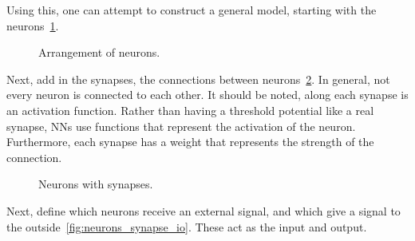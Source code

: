 Using this, one can attempt to construct a general model, starting with the neurons~\ref{fig:neurons}.
\begin{figure}[th]
	\centering
	\caption{Arrangement of neurons.}
	\label{fig:neurons}
\end{figure}
Next, add in the synapses, the connections between neurons~\ref{fig:neurons_synapse}. In general, not every neuron is connected to each other. It should be noted, along each synapse is an activation function. Rather than having a threshold potential like a real synapse, NNs use functions that represent the activation of the neuron. Furthermore, each synapse has a weight that represents the strength of the connection.
\begin{figure}[th]
	\centering
	\caption{Neurons with synapses.}
	\label{fig:neurons_synapse}
\end{figure}
Next, define which neurons receive an external signal, and which give a signal to the outside~\ref{fig:neurons_synapse_io}. These act as the input and output.
